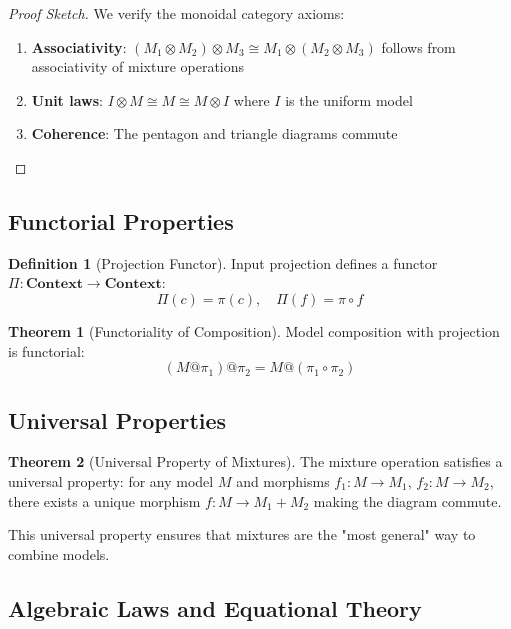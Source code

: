 \documentclass{article}
\theoremstyle{definition}
\newtheorem{definition}{Definition}
\newtheorem{theorem}{Theorem}
\begin{document}
\begin{proof}[Proof Sketch]
We verify the monoidal category axioms:
\begin{enumerate}
    \item \textbf{Associativity}: $(M_1 \otimes M_2) \otimes M_3 \cong M_1 \otimes (M_2 \otimes M_3)$ follows from associativity of mixture operations
    \item \textbf{Unit laws}: $I \otimes M \cong M \cong M \otimes I$ where $I$ is the uniform model
    \item \textbf{Coherence}: The pentagon and triangle diagrams commute
\end{enumerate}
\end{proof}

\subsection{Functorial Properties}

\begin{definition}[Projection Functor]
Input projection defines a functor $\Pi: \mathbf{Context} \rightarrow \mathbf{Context}$:
\begin{equation}
\Pi(c) = \pi(c), \quad \Pi(f) = \pi \circ f
\end{equation}
\end{definition}

\begin{theorem}[Functoriality of Composition]
Model composition with projection is functorial:
\begin{equation}
(M @ \pi_1) @ \pi_2 = M @ (\pi_1 \circ \pi_2)
\end{equation}
\end{theorem}

\subsection{Universal Properties}

\begin{theorem}[Universal Property of Mixtures]
The mixture operation satisfies a universal property: for any model $M$ and morphisms $f_1: M \rightarrow M_1$, $f_2: M \rightarrow M_2$, there exists a unique morphism $f: M \rightarrow M_1 + M_2$ making the diagram commute.
\end{theorem}

This universal property ensures that mixtures are the "most general" way to combine models.

\subsection{Algebraic Laws and Equational Theory}
\end{document}
